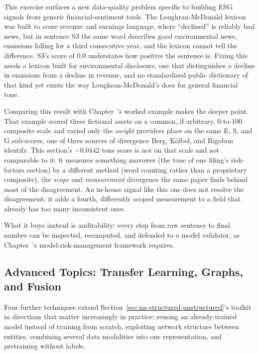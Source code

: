 \documentclass[../ai_in_finance]{subfiles}
\begin{document}
This exercise surfaces a new data-quality problem specific to building ESG signals from generic financial-sentiment tools. The Loughran-McDonald lexicon was built to score revenue and earnings language, where ``declined'' is reliably bad news, but in sentence S3 the same word describes good environmental news, emissions falling for a third consecutive year, and the lexicon cannot tell the difference. S3's score of $0.0$ understates how positive the sentence is. Fixing this needs a lexicon built for environmental disclosure, one that distinguishes a decline in emissions from a decline in revenue, and no standardized public dictionary of that kind yet exists the way Loughran-McDonald's does for general financial tone.

Comparing this result with Chapter~'s worked example makes the deeper point. That example scored three fictional assets on a common, if arbitrary, $0$-to-$100$ composite scale and varied only the \emph{weight} providers place on the same E, S, and G sub-scores, one of three sources of divergence Berg, Kölbel, and Rigobon identify. This section's $-0.0442$ tone score is not on that scale and not comparable to it: it measures something narrower (the tone of one filing's risk-factors section) by a different method (word counting rather than a proprietary composite), the \emph{scope} and \emph{measurement} divergence the same paper finds behind most of the disagreement. An in-house signal like this one does not resolve the disagreement; it adds a fourth, differently scoped measurement to a field that already has too many inconsistent ones.

What it buys instead is auditability: every step from raw sentence to final number can be inspected, recomputed, and defended to a model validator, as Chapter~'s model-risk-management framework requires.

\subsection{Advanced Topics: Transfer Learning, Graphs, and Fusion}
\label{sec:advanced-altdata}

Four further techniques extend Section~\ref{sec:nn-structured-unstructured}'s toolkit in directions that matter increasingly in practice: reusing an already-trained model instead of training from scratch, exploiting network structure between entities, combining several data modalities into one representation, and pretraining without labels.
\end{document}

